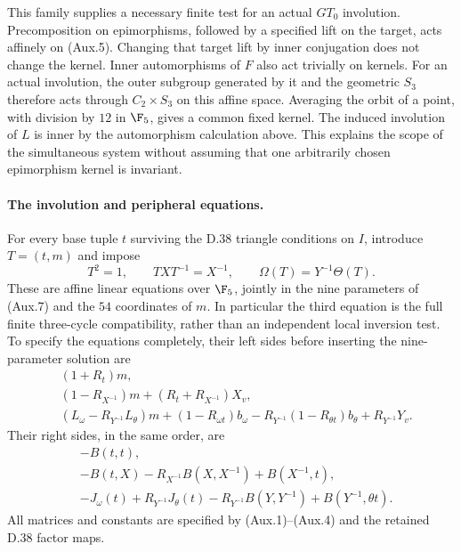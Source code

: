 This family supplies a necessary finite test for an actual
$GT_0$ involution.  Precomposition on epimorphisms, followed
by a specified lift on the target, acts affinely on (Aux.5).
Changing that target lift by inner conjugation does not change
the kernel.  Inner automorphisms of $F$ also act trivially on
kernels.  For an actual involution, the outer subgroup generated
by it and the geometric $S_3$ therefore acts through
$C_2\times S_3$ on this affine space.  Averaging the orbit of
a point, with division by $12$ in $\F_5$, gives a common fixed
kernel.  The induced involution of $L$ is inner by the
automorphism calculation above.  This explains the scope of
the simultaneous system without assuming that one arbitrarily
chosen epimorphism kernel is invariant.

\paragraph{The involution and peripheral equations.}
For every base tuple $t$ surviving the D.38 triangle conditions
on $I$, introduce $T=(t,m)$ and impose
\[
 T^2=1,\qquad TXT^{-1}=X^{-1},\qquad
                  \Omega(T)=Y^{-1}\Theta(T).            \tag{Aux.8}
\]
These are affine linear equations over $\F_5$, jointly in
the nine parameters of (Aux.7) and the $54$ coordinates of
$m$.  In particular the third equation is the full finite
three-cycle compatibility, rather than an independent local
inversion test.  To specify the equations completely, their
left sides before inserting the nine-parameter solution are
\[
 \begin{split}
 &(1+R_t)m,\\
 &(1-R_{X^{-1}})m+(R_t+R_{X^{-1}})X_v,\\
 &(L_\omega-R_{Y^{-1}}L_\theta)m
 +(1-R_{\omega t})b_\omega
 -R_{Y^{-1}}(1-R_{\theta t})b_\theta+R_{Y^{-1}}Y_v.
 \end{split}                                           \tag{Aux.9}
\]
Their right sides, in the same order, are
\[
 \begin{split}
 &-B(t,t),\\
 &-B(t,X)-R_{X^{-1}}B(X,X^{-1})+B(X^{-1},t),\\
 &-J_\omega(t)+R_{Y^{-1}}J_\theta(t)
       -R_{Y^{-1}}B(Y,Y^{-1})+B(Y^{-1},\theta t).
 \end{split}
\]
All matrices and constants are specified by (Aux.1)--(Aux.4)
and the retained D.38 factor maps.

